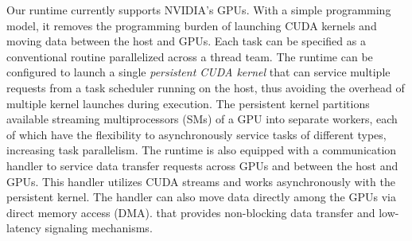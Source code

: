 Our runtime currently supports NVIDIA's GPUs.%
With a simple programming model, it removes the programming burden of launching CUDA kernels and moving data between the host and GPUs.
Each task can be specified as a conventional routine parallelized across a thread team.
The runtime can be configured to launch a single {\em persistent CUDA kernel} that can service multiple requests from a task scheduler running on the host, thus avoiding the overhead of multiple kernel launches during execution.
The persistent kernel partitions available streaming multiprocessors (SMs) of a GPU into separate workers, each of which have the flexibility to asynchronously service tasks of different types, increasing task parallelism.
The runtime is also equipped with a communication handler to service data transfer requests across GPUs and between the host and GPUs.
This handler utilizes CUDA streams and works asynchronously with the persistent kernel.
The handler can also move data directly among the GPUs via direct memory access (DMA).
that provides non-blocking data transfer and low-latency signaling mechanisms. %

